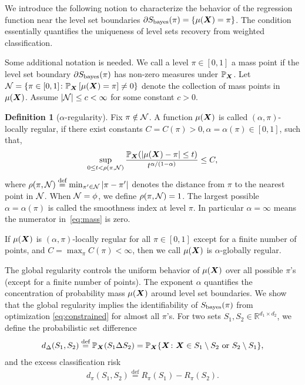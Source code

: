 \documentclass[11pt]{article}
\theoremstyle{plain}
\theoremstyle{definition}
\newtheorem{defn}{Definition}
\def\bayesS{S_{\textup{bayes}}}
\begin{document}
We introduce the following notion to characterize the behavior of the regression function near the level set boundaries $\partial S_{\text{bayes}}(\pi) = \{ \mu(\bm X)= \pi\}$. The condition essentially quantifies the uniqueness of level sets recovery from weighted classification.

Some additional notation is needed. We call a level $\pi\in[0,1]$ a mass point if the level set boundary $\partial \bayesS(\pi)$ has non-zero measures under $\mathbb{P}_{\bm X}$. Let $\mathcal{N}=\{\pi\in[0,1] \colon \mathbb{P}_{\bm X}\left[\mu(\bm X)=\pi\right]\neq 0\}$ denote the collection of mass points in $\mu(\bm X)$. Assume $|\mathcal{N}|\leq c<\infty$ for some constant $c>0$. 

\begin{defn} [$\alpha$-regularity]\label{ass:decboundary} Fix $\pi \notin \mathcal{N}$. A function $\mu(\bm X)$ is called $(\alpha,\pi)$-locally regular, if there exist constants $C=C(\pi)>0, \alpha=\alpha(\pi)\in[0,1]$, such that,
\begin{equation}\label{eq:mass}
\sup_{0\leq t<\rho(\pi, \mathcal{N})}{\mathbb{P}_{\bm X}(|\mu(\bm X)-\pi|\leq t)\over t^{\alpha/(1-\alpha)}}\leq C,
\end{equation}
where $\rho(\pi,\mathcal{N})\stackrel{\text{def}}{=}\min_{\pi'\in \mathcal{N}} |\pi-\pi'|$ denotes the distance from $\pi$ to the nearest point in $\mathcal{N}$.  When $\mathcal{N} = \phi$, we define $\rho(\pi,\mathcal{N})=1$. The largest possible $\alpha=\alpha(\pi)$ is called the smoothness index at level $\pi$. In particular $\alpha=\infty$ means the numerator in~\eqref{eq:mass} is zero. 

If $\mu(\bm X)$ is $(\alpha,\pi)$-locally regular for all $\pi \in [0,1]$ except for a finite number of points, and $C=\max_{\pi} C(\pi)<\infty$, then we call $\mu(\bm X)$ is $\alpha$-globally regular. 
\end{defn}

The global regularity controls the uniform behavior of $\mu(\bm X)$ over all possible $\pi$'s (except for a finite number of points). The exponent $\alpha$ quantifies the concentration of probability mass $\mu(\bm X)$ around level set boundaries. We show that the global regularity implies the identifiability of $\bayesS(\pi)$ from optimization \eqref{eq:constrained} for almost all $\pi$'s. For two sets $S_1, S_2 \in \mathbb{R}^{d_1\times d_2}$, we define the probabilistic set difference 
\begin{align}\label{eq:riskdiff}
d_{\Delta}(S_1,S_2)\stackrel{\text{def}}{=}\mathbb{P}_{\bm X}(S_1\Delta S_2)=\mathbb{P}_{\bm X}\{\bm X\colon \bm X\in S_1\setminus S_2 \text{ or }S_2\setminus S_1\},
\end{align}
and the excess classification risk
\begin{align}\label{eq:setdiff}
d_\pi(S_1,S_2)\stackrel{\text{def}}{=} R_{\pi}(S_1)-R_{\pi}(S_2).
\end{align}
\end{document}
